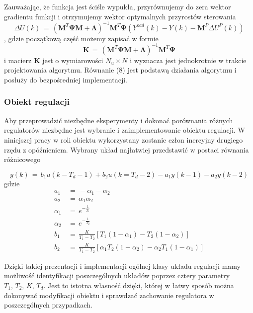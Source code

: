 \par Zauważając, że funkcja jest ściśle wypukła, przyrównujemy do zera wektor gradientu funkcji i otrzymujemy wektor optymalnych przyrostów sterowania
\begin{equation}
\Delta U(k) \, = \, (\bm{M}^T\bm{\Psi}\bm{M}+\bm{\Lambda})^{-1}\bm{M}^T\bm{\Psi}(Y^{zad}(k) - Y(k) - \bm{M}^P \Delta U^P(k))
\end{equation}, 
gdzie początkową część możemy zapisać w formie 
\begin{equation}
\bm{K} \, = \, (\bm{M}^T\bm{\Psi}\bm{M}+\bm{\Lambda})^{-1}\bm{M}^T\bm{\Psi}
\end{equation}
i macierz \( \bm{K}\) jest o wymiarowości \( N_u \times N \) i wyznacza jest jednokrotnie w trakcie projektowania algorytmu. Równanie (8) jest podstawą działania algorytmu i posłuży do bezpośredniej implementacji.  

\subsubsection{Obiekt regulacji}
Aby przeprowadzić niezbędne eksperymenty i dokonać porównania różnych regulatorów niezbędne jest wybranie i zaimplementowanie obiektu regulacji. W niniejszej pracy w roli obiektu wykorzystany zostanie człon inercyjny drugiego rzędu z opóźnieniem. Wybrany układ najłatwiej przedstawić w postaci równania różnicowego 

\begin{equation}
y(k) \, = \, b_1u(k-T_d-1) + b_2u(k=T_d-2)-a_1y(k-1)-a_2y(k-2)
\end{equation}
gdzie 
\begin{align*}
a_1 \, &= \, -\alpha_1 -\alpha_2 \\
a_2 \, &= \, \alpha_1\alpha_2 \\
\alpha_1 \, &= \, e^{-\frac{1}{T_1}} \\
\alpha_2 \, &= \, e^{-\frac{1}{T_2}} \\
b_1 \, &= \, \frac{K}{T_1 - T_2}[T_1(1-\alpha_1)-T_2(1-\alpha_2)] \\
b_2 \, &= \, \frac{K}{T_1 - T_2}[\alpha_1 T_2(1-\alpha_2)-\alpha_2 T_1(1-\alpha_1)]
\end{align*}

\par Dzięki takiej prezentacji i implementacji ogólnej klasy układu regulacji mamy możliwość identyfikacji poszczególnych układów poprzez cztery parametry \( T_1, \, T_2, \, K, \, T_d \). Jest to istotna własność dzięki, której w łatwy sposób można dokonywać modyfikacji obiektu i sprawdzać zachowanie regulatora w poszczególnych przypadkach.

